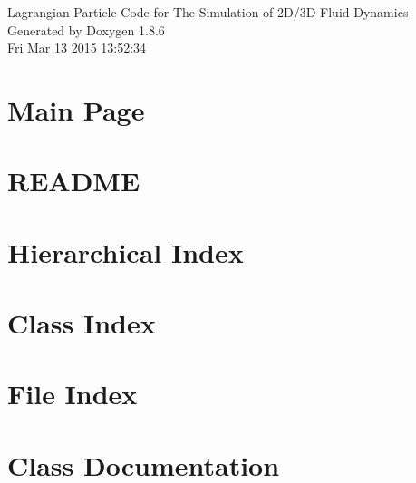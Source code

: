 \documentclass[twoside]{book}
\newcommand{\clearemptydoublepage}{%
  \newpage{\pagestyle{empty}\cleardoublepage}%
}
\begin{document}
\hypersetup{pageanchor=false}
\begin{titlepage}
\vspace*{7cm}
\begin{center}%
{\Large Lagrangian Particle Code for The Simulation of 2\-D/3\-D Fluid Dynamics }\\
\vspace*{1cm}
{\large Generated by Doxygen 1.8.6}\\
\vspace*{0.5cm}
{\small Fri Mar 13 2015 13:52:34}\\
\end{center}
\end{titlepage}
\clearemptydoublepage
\tableofcontents
\clearemptydoublepage
{}
\hypersetup{pageanchor=true}

\chapter{Main Page}
\label{index}\hypertarget{index}{}
\chapter{R\-E\-A\-D\-M\-E}
\label{md_README}
\hypertarget{md_README}{}

\chapter{Hierarchical Index}

\chapter{Class Index}

\chapter{File Index}

\chapter{Class Documentation}



































\end{document}

